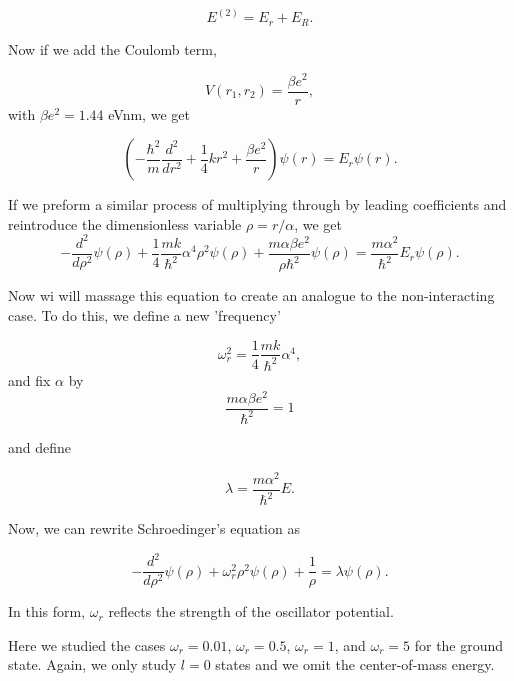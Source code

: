 \documentclass[%
oneside,                 %
final,                   %
10pt]{article}
\begin{document}
\begin{equation*}
E^{(2)}=E_r+E_R.
\end{equation*}

Now if we add the Coulomb term,

\begin{equation*}
V(r_1,r_2) =\frac{\beta e^2}{r},
\end{equation*}
with $\beta e^2=1.44$ eVnm, we get

\begin{equation*}
\left(  -\frac{\hbar^2}{m} \frac{d^2}{dr^2}+ \frac{1}{4}k r^2+\frac{\beta e^2}{r}\right)\psi(r)  = E_r \psi(r).
\end{equation*}

If we preform a similar process of multiplying through by leading coefficients and reintroduce the dimensionless variable $\rho = r/\alpha$, we get
\begin{equation*}
  -\frac{d^2}{d\rho^2} \psi(\rho) 
       + \frac{1}{4}\frac{mk}{\hbar^2} \alpha^4\rho^2\psi(\rho)+\frac{m\alpha \beta e^2}{\rho\hbar^2}\psi(\rho)  = 
\frac{m\alpha^2}{\hbar^2}E_r \psi(\rho) .
\end{equation*}

Now wi will massage this equation to create an analogue to the non-interacting case.  To do this, we define a new 'frequency'

\begin{equation*}
\omega_r^2=\frac{1}{4}\frac{mk}{\hbar^2} \alpha^4,
\end{equation*}
and fix $\alpha$ by 
\begin{equation*}
\frac{m\alpha \beta e^2}{\hbar^2}=1
\end{equation*}

and define

\begin{equation*}
\lambda = \frac{m\alpha^2}{\hbar^2}E.
\end{equation*}

Now, we can rewrite Schroedinger's equation as

\begin{equation*}
  -\frac{d^2}{d\rho^2} \psi(\rho) + \omega_r^2\rho^2\psi(\rho) +\frac{1}{\rho} = \lambda \psi(\rho).
\end{equation*}

In this form, $\omega_r$ reflects the strength of the oscillator potential.

Here we studied the cases $\omega_r = 0.01$, $\omega_r = 0.5$, $\omega_r =1$,
and $\omega_r = 5$ for the ground state. Again, we only study $l=0$ states and we omit the center-of-mass energy.
\end{document}
